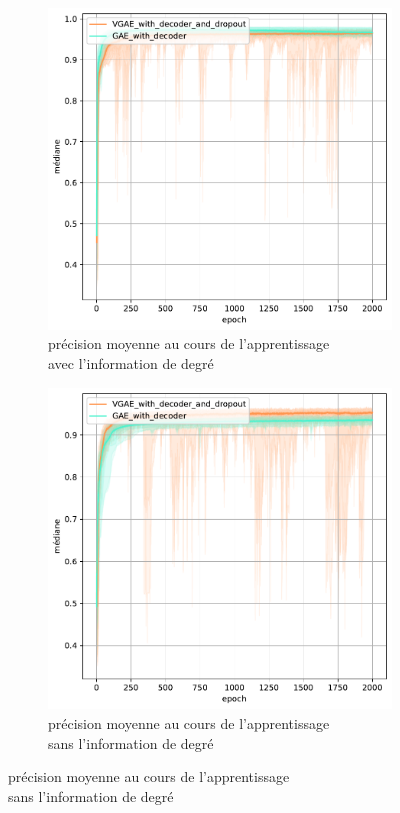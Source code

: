 \documentclass{article}
\begin{document}
\begin{figure}[H]
    \centering
    \captionsetup{justification=centering}
    \begin{subfigure}{0.45\textwidth}
      \includegraphics[width=\textwidth]{graphics/APs_degree_vgae_cinf.svg.pdf}
      \centering
      \caption{précision moyenne au cours de l'apprentissage\\ avec l'information de degré}
    \end{subfigure}
    \begin{subfigure}{0.45\textwidth}
      \includegraphics[width=\textwidth]{graphics/APs_no_degree_vgae_cinf.svg.pdf}
      \centering
      \caption{précision moyenne au cours de l'apprentissage\\ sans l'information de degré}
    \end{subfigure}
    

\end{figure}
\end{document}
